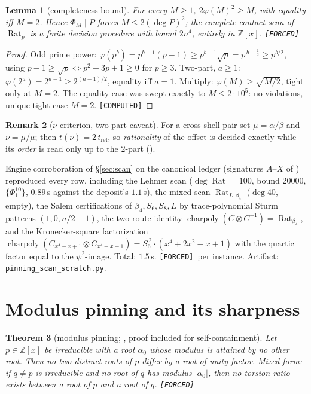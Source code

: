 \documentclass[11pt]{article}
\newcommand{\F}{\textnormal{\texttt{[FORCED]}}}
\newcommand{\C}{\textnormal{\texttt{[COMPUTED]}}}
\newcommand{\Z}{\mathbb{Z}}
\newcommand{\Rat}{\operatorname{Rat}}
\newtheorem{theorem}{Theorem}[section]
\newtheorem{lemma}[theorem]{Lemma}
\theoremstyle{definition}
\newtheorem{remark}[theorem]{Remark}
\begin{document}
\begin{lemma}[completeness bound]\label{lem:totient}
For every $M\ge1$, $2\varphi(M)^2\ge M$, with equality iff $M=2$. Hence
$\Phi_M\mid P$ forces $M\le 2(\deg P)^2$; the complete contact scan of $\Rat_p$
is a finite decision procedure with bound $2n^4$, entirely in $\Z[x]$. \F
\end{lemma}

\begin{proof}
Odd prime power: $\varphi(p^b)=p^{b-1}(p-1)\ge p^{b-1}\sqrt{p}=p^{\,b-\frac12}\ge p^{b/2}$,
using $p-1\ge\sqrt p\iff p^2-3p+1\ge0$ for $p\ge3$. Two-part, $a\ge1$:
$\varphi(2^a)=2^{a-1}\ge 2^{(a-1)/2}$, equality iff $a=1$. Multiply:
$\varphi(M)\ge\sqrt{M/2}$, tight only at $M=2$. The equality case was swept
exactly to $M\le 2\cdot10^{5}$: no violations, unique tight case $M=2$. \C
\end{proof}

\begin{remark}[$\nu$-criterion, two-part caveat]\label{rem:nu2part}
For a cross-shell pair set $\mu=\alpha/\beta$ and $\nu=\mu/\bar\mu$; then
$t(\nu)=2\,t_{\mathrm{rel}}$, so \emph{rationality} of the offset is decided
exactly while its \emph{order} is read only up to the $2$-part
(\cite[Rem.~7.6]{relcharge}).
\end{remark}

Engine corroboration of \S\ref{sec:scan} on the canonical ledger (signatures
$A$--$X$ of \cite{relcharge}) reproduced every row, including the Lehmer scan
($\deg\Rat=100$, bound $20000$, $\{\Phi_1^{10}\}$, $0.89$\,s against the
deposit's $1.1$\,s), the mixed scan $\Rat_{L,\beta_4}$ ($\deg 40$, empty), the
Salem certifications of $\beta_4,S_6,S_8,L$ by trace-polynomial Sturm patterns
$(1,0,n/2-1)$, the two-route identity
$\operatorname{charpoly}(C\otimes C^{-1})=\Rat_{\beta_4}$, and the
Kronecker-square factorization
$\operatorname{charpoly}(C_{x^4-x+1}\otimes C_{x^4-x+1})=S_6^{\,2}\cdot(x^4+2x^2-x+1)$
with the quartic factor equal to the $\psi^2$-image. Total: $1.5$\,s. \F\ per
instance. Artifact: \texttt{pinning\_scan\_scratch.py}.

\section{Modulus pinning and its sharpness}\label{sec:pinning}

\begin{theorem}[modulus pinning; {\cite[Thm.~7.13]{relcharge}}, proof included for
self-containment]\label{thm:pin}
Let $p\in\Z[x]$ be irreducible with a root $\alpha_0$ whose modulus is attained
by no other root. Then no two distinct roots of $p$ differ by a root-of-unity
factor. Mixed form: if $q\neq p$ is irreducible and no root of $q$ has modulus
$|\alpha_0|$, then no torsion ratio exists between a root of $p$ and a root of
$q$. \F
\end{theorem}
\end{document}
